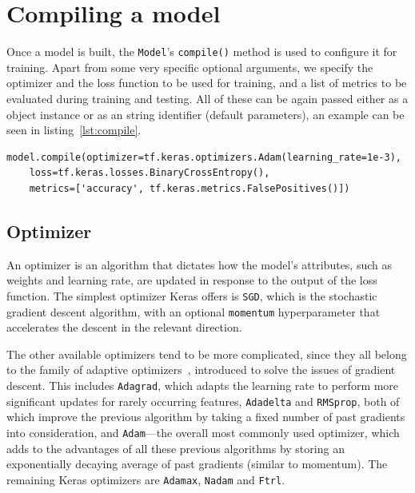 \section{Compiling a model}
\label{compiling-a-model}
Once a model is built, the \texttt{Model}'s \texttt{compile()} method is used to configure
it for training. Apart from some very specific optional arguments,
we specify the optimizer and the loss function to be used for training, and a list of  metrics to be evaluated
during training and testing.
All of these can be again passed either as a object instance or as an string identifier (default parameters),
an example can be seen in listing~\ref{lst:compile}.

\begin{lstlisting}[caption={Configuring a Keras model for training using its \texttt{compile} method.},
                   label={lst:compile}]
model.compile(optimizer=tf.keras.optimizers.Adam(learning_rate=1e-3),
    loss=tf.keras.losses.BinaryCrossEntropy(),
    metrics=['accuracy', tf.keras.metrics.FalsePositives()])
\end{lstlisting}


\subsection*{Optimizer}
\label{optimizer}
An optimizer is an algorithm that dictates how the model's attributes, such as weights and learning rate,
are updated in response to the output of the loss function. The simplest optimizer Keras
offers is \texttt{SGD}, which is the stochastic gradient descent algorithm, with an optional
\texttt{momentum} hyperparameter that accelerates the descent in the relevant direction.

The other available optimizers tend to be more complicated, since they all belong to the family of adaptive
optimizers~\cite{ruder2016overview},
introduced to solve the issues of gradient descent. This includes \texttt{Adagrad},
which adapts the learning rate to perform more significant updates for rarely occurring features,
\texttt{Adadelta} and \texttt{RMSprop}, both of which improve the previous algorithm by taking a fixed number
of past gradients into consideration, and \texttt{Adam}---the overall most commonly
used optimizer, which adds to the advantages of all these previous algorithms by storing
an exponentially decaying average of past gradients (similar to momentum).
The remaining Keras optimizers are \texttt{Adamax}, \texttt{Nadam} and \texttt{Ftrl}.



